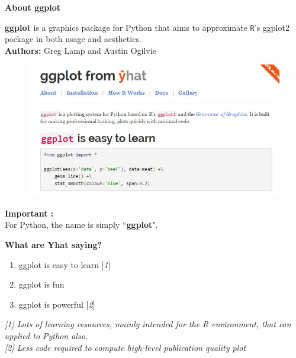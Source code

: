 \documentclass{beamer}
\begin{document}

\begin{frame}
	\Large
	\noindent\textbf{About ggplot}
	\bigskip
	
	\textbf{ggplot} is a graphics package for Python that aims to approximate \texttt{R}'s ggplot2 package in both usage and aesthetics.\\
	\bigskip
	\textbf{Authors:} Greg Lamp and Austin Ogilvie
\end{frame}


\begin{frame}
	\begin{figure}
		\centering
		\includegraphics[width=1.1\linewidth]{ggplot-yhat}
	\end{figure}
	\Large
	\noindent \textbf{Important :} \\ For Python, the name is simply ``\textbf{ggplot}".
\end{frame}
\begin{frame}
	\Large
	\noindent\textbf{What are Yhat saying?}
	
	\begin{enumerate}
		\item ggplot is easy to learn [\textit{1}]
		\item ggplot is fun
		\item ggplot is powerful [\textit{2}]
	\end{enumerate}
	
	\begin{framed}
		\textit{[1] Lots of learning resources, mainly intended for the R environment, that can applied to Python also.}\\
		\bigskip
		\textit{[2] Less code required to compute high-level publication quality plot}
	\end{framed}
\end{frame}	
\end{document}
